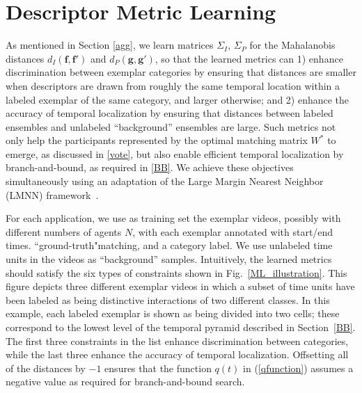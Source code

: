 
\section{Descriptor Metric Learning}
\label{MetLearn}

As mentioned in Section \ref{agg}, we learn matrices $\Sigma_{I}$, $\Sigma_{P}$ for the Mahalanobis distances $d_I(\mathbf{f},\mathbf{f}')$ and $d_P(\mathbf{g},\mathbf{g}')$, so that the learned metrics can 1) enhance discrimination between exemplar categories by ensuring that distances are smaller when descriptors are drawn from roughly the same temporal location within a labeled exemplar of the same category, and larger otherwise; and 2) enhance the accuracy of temporal localization by ensuring that distances between labeled ensembles and unlabeled ``background'' ensembles are large. Such metrics not only help the participants represented by the optimal matching matrix $W^{*}$ to emerge, as discussed in \ref{vote}, but also enable efficient temporal localization by branch-and-bound, as required in \ref{BB}. We achieve these objectives simultaneously using an adaptation of the Large Margin Nearest Neighbor (LMNN) framework~\cite{Weinberger:ML}. 

For each application, we use as training set the exemplar videos, possibly with different numbers of agents $N$, with each exemplar annotated with start/end times. ``ground-truth"matching, and a category label. We use unlabeled time units in the videos as ``background'' samples. Intuitively, the learned metrics should satisfy the six types of constraints shown in Fig.~\ref{ML_illustration}. This figure depicts three different exemplar videos in which a subset of time units have been labeled as being distinctive interactions of two different classes. In this example, each labeled exemplar is shown as being divided into two cells; these correspond to the lowest level of the temporal pyramid described in Section~\ref{BB}. The first three constraints in the list enhance discrimination between categories, while the last three enhance the accuracy of temporal localization. Offsetting all of the distances by $-1$ ensures that the function $q(t)$ in (\ref{qfunction}) assumes a negative value as required for branch-and-bound search. 


